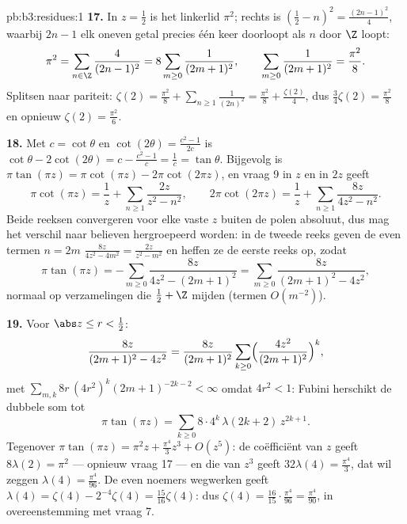 \begin{solution}{pb:b3:residues:1}
\textbf{17.} In $z = \frac12$ is het linkerlid $\pi^2$; rechts is
$(\frac12 - n)^2 = \frac{(2n-1)^2}4$, waarbij $2n - 1$ elk oneven
getal precies één keer doorloopt als $n$ door $\Z$ loopt:
\[
\pi^2 = \sum_{n\in\Z}\frac{4}{(2n-1)^2}
= 8\sum_{m\geq0}\frac1{(2m+1)^2},
\qquad
\sum_{m\geq0}\frac1{(2m+1)^2} = \frac{\pi^2}8 .
\]
Splitsen naar pariteit: $\zeta(2) = \frac{\pi^2}8 +
\sum_{n\geq1}\frac1{(2n)^2} = \frac{\pi^2}8 + \frac{\zeta(2)}4$,
dus $\frac34\zeta(2) = \frac{\pi^2}8$ en opnieuw $\zeta(2) =
\frac{\pi^2}6$.

\textbf{18.} Met $c = \cot\theta$ en $\cot(2\theta) =
\frac{c^2-1}{2c}$ is $\cot\theta - 2\cot(2\theta) = c -
\frac{c^2-1}c = \frac1c = \tan\theta$. Bijgevolg is $\pi\tan(\pi
z) = \pi\cot(\pi z) - 2\pi\cot(2\pi z)$, en vraag 9 in $z$ en in
$2z$ geeft
\[
\pi\cot(\pi z) = \frac1z +
\sum_{n\geq1}\frac{2z}{z^2 - n^2},
\qquad
2\pi\cot(2\pi z) = \frac1z +
\sum_{n\geq1}\frac{8z}{4z^2 - n^2} .
\]
Beide reeksen convergeren voor elke vaste $z$ buiten de polen
absoluut, dus mag het verschil naar believen hergroepeerd worden:
in de tweede reeks geven de even termen $n = 2m$ $\frac{8z}{4z^2
- 4m^2} = \frac{2z}{z^2 - m^2}$ en heffen ze de eerste reeks
 op, zodat
\[
\pi\tan(\pi z) = -\sum_{m\geq0}\frac{8z}{4z^2 - (2m+1)^2}
= \sum_{m\geq0}\frac{8z}{(2m+1)^2 - 4z^2} ,
\]
normaal op  verzamelingen die $\frac12 + \Z$ mijden
(termen $O(m^{-2})$).

\textbf{19.} Voor $\abs z \leq r < \frac12$:
\[
\frac{8z}{(2m+1)^2 - 4z^2} = \frac{8z}{(2m+1)^2}
\sum_{k\geq0}\Bigl(\frac{4z^2}{(2m+1)^2}\Bigr)^{k},
\]
met $\sum_{m,k}8r\,(4r^2)^k(2m+1)^{-2k-2} < \infty$ omdat $4r^2 <
1$: Fubini herschikt de dubbele som tot
\[
\pi\tan(\pi z) =
\sum_{k\geq0}8\cdot4^k\,\lambda(2k+2)\,z^{2k+1} .
\]
Tegenover $\pi\tan(\pi z) = \pi^2z + \frac{\pi^4}3z^3 + O(z^5)$:
de coëfficiënt van $z$ geeft $8\lambda(2) = \pi^2$ --- opnieuw
vraag 17 --- en die van $z^3$ geeft $32\lambda(4) =
\frac{\pi^4}3$, dat wil zeggen $\lambda(4) = \frac{\pi^4}{96}$.
De even noemers wegwerken geeft $\lambda(4) = \zeta(4) -
2^{-4}\zeta(4) = \frac{15}{16}\zeta(4)$: dus $\zeta(4) =
\frac{16}{15}\cdot \frac{\pi^4}{96} = \frac{\pi^4}{90}$, in
overeenstemming met vraag 7.


\end{solution}
